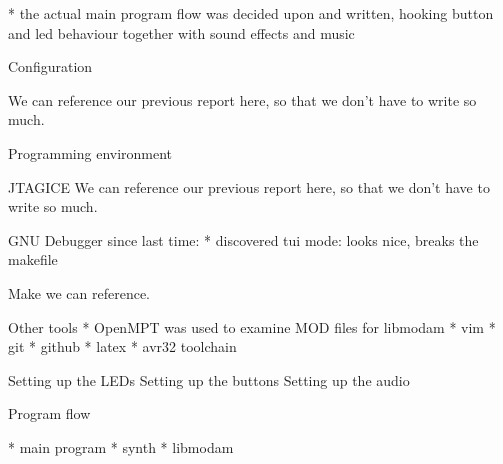 * the actual main program flow was decided upon and written, hooking button and led behaviour together with sound effects and music



Configuration

We can reference our previous report here, so that we don't have to write so much.


Programming environment

JTAGICE
We can reference our previous report here, so that we don't have to write so much.

GNU Debugger
since last time:
* discovered tui mode: looks nice, breaks the makefile

Make
we can reference.

Other tools
* OpenMPT was used to examine MOD files for libmodam
* vim
* git
* github
* latex
* avr32 toolchain

Setting up the LEDs
Setting up the buttons
Setting up the audio


Program flow

* main program
* synth
* libmodam

